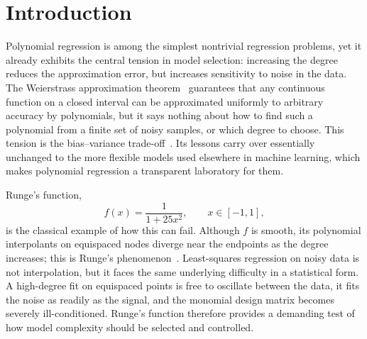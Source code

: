 \section{Introduction}\label{sec:introduction}



Polynomial regression is among the simplest nontrivial regression problems, yet
it already exhibits the central tension in model selection: increasing the
degree reduces the approximation error, but increases sensitivity to noise in
the data. The Weierstrass approximation theorem~\cite{weierstrass_1885} guarantees that any continuous
function on a closed interval can be approximated uniformly to arbitrary
accuracy by polynomials, but it says nothing about how to find such a polynomial
from a finite set of noisy samples, or which degree to choose. This
tension is the bias--variance trade-off~\cite{hjorth-jensen_2026, hastie_2017}. Its lessons carry over essentially
unchanged to the more flexible models used elsewhere in machine learning, which
makes polynomial regression a transparent laboratory for them.

Runge's function,
\begin{equation}\label{eq:runges_function}
  f(x) = \frac{1}{1+25x^2}, \qquad x\in[-1,1],
\end{equation}
is the classical example of how this can fail. Although $f$ is smooth,
its polynomial interpolants on equispaced nodes diverge near the endpoints
as the degree increases;
this is Runge's phenomenon~\cite{runge_1901,demarchi_2020}.
Least-squares regression on noisy data is not interpolation,
but it faces the same underlying difficulty in a statistical form.
A high-degree fit on equispaced points is free to oscillate between the data,
it fits the noise as readily as the signal,
and the monomial design matrix becomes severely ill-conditioned.
Runge's function therefore provides a demanding test of how model complexity
should be selected and controlled.

